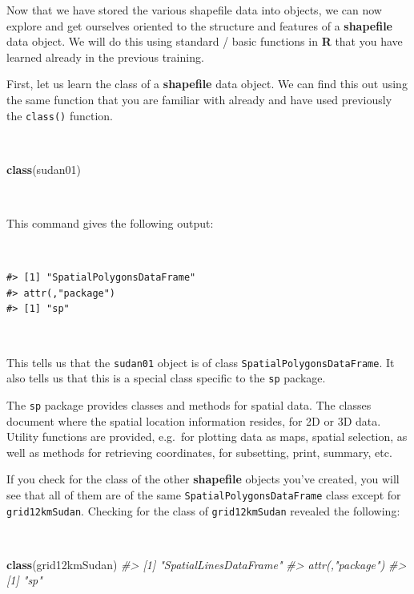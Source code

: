 \documentclass[12pt,a4paper,a4paper]{book}
\newenvironment{Shaded}{\begin{snugshade}}{\end{snugshade}}
\newcommand{\KeywordTok}[1]{\textcolor[rgb]{0.13,0.29,0.53}{\textbf{#1}}}
\newcommand{\CommentTok}[1]{\textcolor[rgb]{0.56,0.35,0.01}{\textit{#1}}}
\newcommand{\NormalTok}[1]{#1}
\theoremstyle{definition}
\theoremstyle{definition}
\theoremstyle{definition}
\theoremstyle{remark}
\begin{document}
Now that we have stored the various shapefile data into objects, we can
now explore and get ourselves oriented to the structure and features of
a \textbf{shapefile} data object. We will do this using standard / basic
functions in \textbf{R} that you have learned already in the previous
training.

First, let us learn the class of a \textbf{shapefile} data object. We
can find this out using the same function that you are familiar with
already and have used previously the \texttt{class()} function.

~

\begin{Shaded}
\begin{Highlighting}[]
\KeywordTok{class}\NormalTok{(sudan01)}
\end{Highlighting}
\end{Shaded}

~

This command gives the following output:

~

\begin{verbatim}
#> [1] "SpatialPolygonsDataFrame"
#> attr(,"package")
#> [1] "sp"
\end{verbatim}

~

This tells us that the \texttt{sudan01} object is of class
\texttt{SpatialPolygonsDataFrame}. It also tells us that this is a
special class specific to the \texttt{sp} package.

The \texttt{sp} package provides classes and methods for spatial data.
The classes document where the spatial location information resides, for
2D or 3D data. Utility functions are provided, e.g.~for plotting data as
maps, spatial selection, as well as methods for retrieving coordinates,
for subsetting, print, summary, etc.

If you check for the class of the other \textbf{shapefile} objects
you've created, you will see that all of them are of the same
\texttt{SpatialPolygonsDataFrame} class except for
\texttt{grid12kmSudan}. Checking for the class of \texttt{grid12kmSudan}
revealed the following:

~

\begin{Shaded}
\begin{Highlighting}[]
\KeywordTok{class}\NormalTok{(grid12kmSudan)}
\CommentTok{#> [1] "SpatialLinesDataFrame"}
\CommentTok{#> attr(,"package")}
\CommentTok{#> [1] "sp"}
\end{Highlighting}
\end{Shaded}
\end{document}
